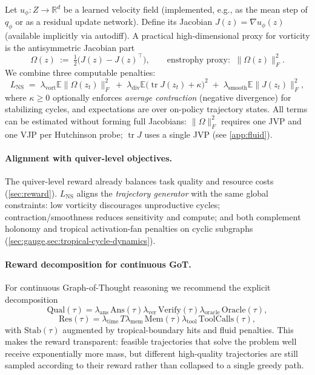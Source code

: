 \documentclass[11pt]{article}
\theoremstyle{definition}
\theoremstyle{plain}
\theoremstyle{remark}
\newcommand{\R}{\mathbb{R}}
\newcommand{\E}{\mathbb{E}}
\newcommand{\tr}{\operatorname{tr}}
\begin{document}
Let $u_\phi:Z\to\R^{d}$ be a learned velocity field (implemented, e.g., as the mean step of $q_\phi$ or as a residual update network).
Define its Jacobian $J(z)=\nabla u_\phi(z)$ (available implicitly via autodiff).
A practical high-dimensional proxy for vorticity is the antisymmetric Jacobian part
\[
\Omega(z)\ :=\ \tfrac12\bigl(J(z)-J(z)^\top\bigr),
\qquad
\text{enstrophy proxy: }\ \|\Omega(z)\|_F^2.
\]
We combine three computable penalties:
\[
L_{\mathrm{NS}} \;=\;
\lambda_{\mathrm{vort}}\E\|\Omega(z_t)\|_F^2
\;+\;
\lambda_{\mathrm{div}}\E\bigl(\tr J(z_t) + \kappa\bigr)^2
\;+\;
\lambda_{\mathrm{smooth}}\E\|J(z_t)\|_F^2,
\]
where $\kappa\ge 0$ optionally enforces \emph{average contraction} (negative divergence) for stabilizing cycles, and expectations are over on-policy trajectory states.
All terms can be estimated without forming full Jacobians: $\|\Omega\|_F^2$ requires one JVP and one VJP per Hutchinson probe; $\tr J$ uses a single JVP (see \cref{app:fluid}).

\paragraph{Alignment with quiver-level objectives.}
The quiver-level reward already balances task quality and resource costs (\cref{sec:reward}).
$L_{\mathrm{NS}}$ aligns the \emph{trajectory generator} with the same global constraints:
low vorticity discourages unproductive cycles; contraction/smoothness reduces sensitivity and compute; and both complement holonomy and tropical activation-fan penalties on cyclic subgraphs (\cref{sec:gauge,sec:tropical-cycle-dynamics}).

\paragraph{Reward decomposition for continuous GoT.}
For continuous Graph-of-Thought reasoning we recommend the explicit decomposition
\[
\mathrm{Qual}(\tau)=
\lambda_{\mathrm{ans}}\,\mathrm{Ans}(\tau)
\lambda_{\mathrm{ver}}\,\mathrm{Verify}(\tau)
\lambda_{\mathrm{oracle}}\,\mathrm{Oracle}(\tau),
\]
\[
\mathrm{Res}(\tau)=
\lambda_{\mathrm{time}}\,T
\lambda_{\mathrm{mem}}\,\mathrm{Mem}(\tau)
\lambda_{\mathrm{tool}}\,\mathrm{ToolCalls}(\tau),
\]
with $\mathrm{Stab}(\tau)$ augmented by tropical-boundary hits and fluid penalties.
This makes the reward transparent:
feasible trajectories that solve the problem well receive exponentially more mass, but different high-quality trajectories are still sampled according to their reward rather than collapsed to a single greedy path.
\end{document}
